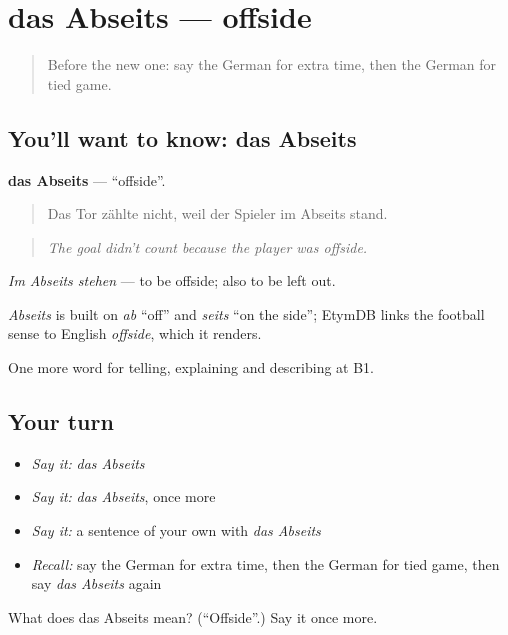 \section[das Abseits]{das Abseits — offside}

\label{lesson:GE-C507-abseits}



\begin{quote}
Before the new one: say the German for extra time, then the German for tied game.
\end{quote}

\subsection*{You'll want to know: das Abseits}
\textbf{das Abseits} — \textquotedblleft{}offside\textquotedblright{}.

\begin{quote}
Das Tor zählte nicht, weil der Spieler im Abseits stand.
\end{quote}

\begin{quote}
\emph{The goal didn't count because the player was offside.}
\end{quote}

\emph{Im Abseits stehen} — to be offside; also to be left out.

\begin{cousinweb}
\emph{Abseits} is built on \emph{ab} \textquotedblleft{}off\textquotedblright{} and \emph{seits} \textquotedblleft{}on the side\textquotedblright{}; EtymDB links the football sense to English \emph{offside}, which it renders.
\end{cousinweb}

\begin{grammarlens}[title={What you've built}]
One more word for telling, explaining and describing at B1.
\end{grammarlens}

\subsection*{Your turn}
\begin{itemize}
\raggedright
  \item \emph{Say it:} \emph{das Abseits}
  \item \emph{Say it:} \emph{das Abseits}, once more
  \item \emph{Say it:} a sentence of your own with \emph{das Abseits}
  \item \emph{Recall:} say the German for extra time, then the German for tied game, then say \emph{das Abseits} again
\end{itemize}

\begin{tcolorbox}[breakable,colback=teal!4,colframe=teal!35!black,title={Before you move on}]
What does das Abseits mean? (\textquotedblleft{}Offside\textquotedblright{}.) Say it once more.
\end{tcolorbox}

